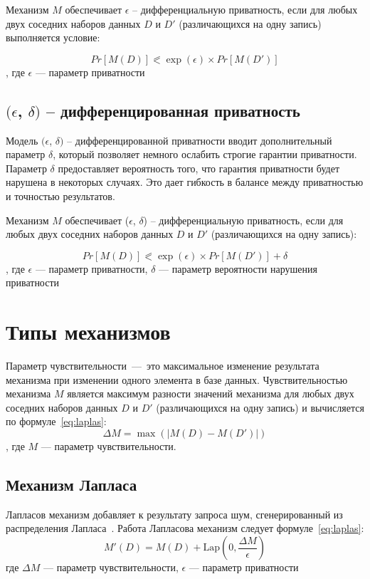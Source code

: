 Механизм $M$ обеспечивает $\epsilon$ -- дифференциальную приватность, если для любых двух соседних наборов данных $D$ и $D'$ (различающихся на одну запись) выполняется условие:

\begin{equation}\label{equ:eps-diff}
	Pr[M(D)] \eqslantless \exp(\epsilon) \times Pr[M(D')]
\end{equation}
, где $\epsilon$ --- параметр приватности

\subsection{$(\epsilon$, $\delta)$ -- дифференцированная приватность}
Модель $(\epsilon$, $\delta)$ -- дифференцированной приватности вводит дополнительный параметр $\delta$, который позволяет немного ослабить строгие гарантии приватности.
Параметр $\delta$ предоставляет вероятность того, что гарантия приватности будет нарушена в некоторых случаях.
Это дает гибкость в балансе между приватностью и точностью результатов.~\cite{main}

Механизм $M$ обеспечивает ($\epsilon$, $\delta$) -- дифференциальную приватность, если для любых двух соседних наборов данных $D$ и $D'$ (различающихся на одну запись):

\begin{equation}\label{equ:eps-delta-diff}
	Pr[M(D)] \eqslantless \exp(\epsilon) \times Pr[M(D')] + \delta
\end{equation}
, где $\epsilon$ --- параметр приватности, $\delta$ --- параметр вероятности нарушения приватности



\section{Типы механизмов}

Параметр чувствительности~---~это максимальное изменение результата механизма при изменении одного элемента в базе данных. Чувствительностью механизма $M$ является максимум разности значений механизма для любых двух соседних наборов данных $D$ и $D'$ (различающихся на одну запись) и вычисляется по формуле~\ref{eq:laplas}:
\begin{equation}\label{eq:laplas}
	\Delta M  = \max(|M(D) - M(D')|)
\end{equation}
, где $M$ --- параметр чувствительности.

\subsection{Механизм Лапласа}
Лапласов механизм добавляет к результату запроса шум, сгенерированный из распределения Лапласа~\cite{main}.
Работа Лапласова механизм следует формуле~\ref{eq:laplas}:
\begin{equation}\label{eq:laplas}
	M'(D) = M(D) + \text{Lap}(0, \frac{\Delta M}{\epsilon})
\end{equation}
где $\Delta M$ --- параметр чувствительности, $\epsilon$ --- параметр приватности

